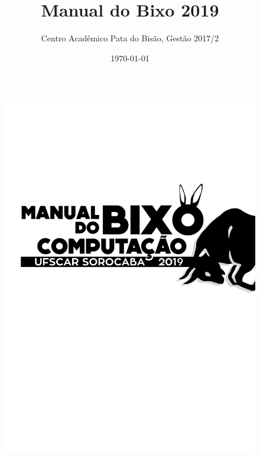 \documentclass[12pt]{article}
\title{Manual do Bixo 2019}
\author{Centro Acadêmico Pata do Bisão, Gestão 2017/2}
\date{\today}
\begin{document}
\begin{figure}[p]
  \thispagestyle{empty}
  \hspace*{-2.4cm}\includegraphics{./imagem/capa2019.pdf}
\end{figure}

\clearpage

\thispagestyle{empty}

\clearpage
\setcounter{page}{1}

\clearpage
\tableofcontents

\clearpage


\clearpage











\clearpage

\thispagestyle{empty}
\end{document}

